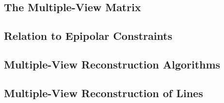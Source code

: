 \subsection{The Multiple-View Matrix}%
\label{sub:the_multiple_view_matrix}


\subsection{Relation to Epipolar Constraints}%
\label{sub:relation_to_epipolar_constraints}


\subsection{Multiple-View Reconstruction Algorithms}%
\label{sub:multiple_view_reconstruction_algorithms}


\subsection{Multiple-View Reconstruction of Lines}%
\label{sub:multiple_view_reconstruction_of_lines}


